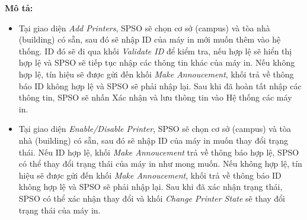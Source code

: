        \newpage
        \textbf{Mô tả:}
        \begin{itemize}
            \item Tại giao diện \textit{Add Printers}, SPSO sẽ chọn cơ sở (campus) và tòa nhà (building) có sẵn, sau đó sẽ nhập ID của máy in mới muốn thêm vào hệ thống. ID đó sẽ đi qua khối \textit{Validate ID} để kiểm tra, nếu hợp lệ sẽ hiển thị hợp lệ và SPSO sẽ tiếp tục nhập các thông tin khác của máy in. Nếu không hợp lệ, tín hiệu sẽ được gửi đến khối \textit{Make Annoucement}, khối trả về thông báo ID không hợp lệ và SPSO sẽ phải nhập lại. Sau khi đã hoàn tất nhập các thông tin, SPSO sẽ nhấn Xác nhận và lưu thông tin vào Hệ thống các máy in.
            \item Tại giao diện \textit{Enable/Disable Printer}, SPSO sẽ chọn cơ sở (campus) và tòa nhà (building) có sẵn, sau đó sẽ nhập ID của máy in muốn thay đổi trạng thái. Nếu ID hợp lệ, khối \textit{Make Annoucement} trả về thông báo hợp lệ, SPSO có thể thay đổi trạng thái của máy in như mong muốn. Nếu không hợp lệ, tín hiệu sẽ được gửi đến khối \textit{Make Annoucement}, khối trả về thông báo ID không hợp lệ và SPSO sẽ phải nhập lại. Sau khi đã xác nhận trạng thái, SPSO có thể xác nhận thay đổi và khối \textit{Change Printer State} sẽ thay đổi trạng thái của máy in.
        \end{itemize}



        \newpage
